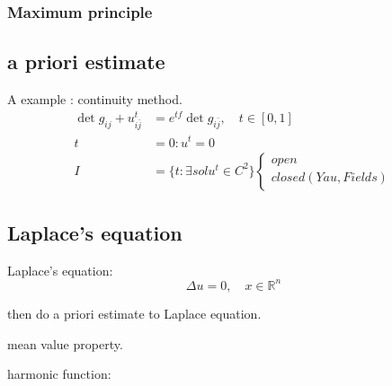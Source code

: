 \subsubsection{Maximum principle}

\subsection{a priori estimate}

A example : continuity method.
\begin{equation*}
    \begin{aligned}
        \det{g_{ij}+u^t_{i\bar{j}}} &= e^{tf}\det{g_{i\bar{j}}},\quad t\in [0,1]\\
        t&=0:u^t=0\\
        I&=\{t:\exists sol u^t\in C^2\}
        \begin{cases}
            open\\
            closed(Yau , Fields)
        \end{cases}
    \end{aligned}
\end{equation*}

\subsection{Laplace's equation}
Laplace's equation:
\begin{equation*}
    \Delta u=0,\quad x\in \mathbb{R}^n 
\end{equation*}



then do a priori estimate to Laplace equation.\par

mean value property.\par

harmonic function: